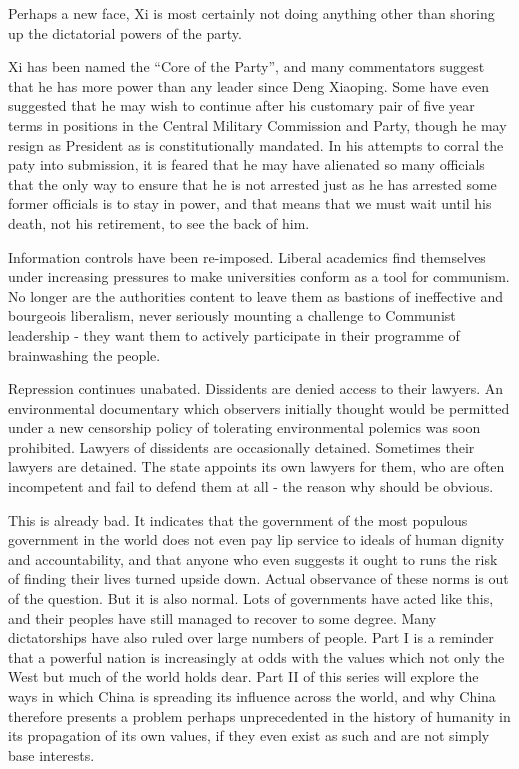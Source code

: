 \documentclass[1opt,a4paper]{article}
\newcounter{count}
\begin{document}
\begin{multicols}{2}
Perhaps a new face, Xi is most certainly not doing anything other than shoring up the dictatorial powers of the party.

Xi has been named the ``Core of the Party'', and many commentators suggest that he has more power than any leader since Deng Xiaoping. Some have even suggested that he may wish to continue after his customary pair of five year terms in positions in the Central Military Commission and Party, though he may resign as President as is constitutionally mandated. In his attempts to corral the paty into submission, it is feared that he may have alienated so many officials that the only way to ensure that he is not arrested just as he has arrested some former officials is to stay in power, and that means that we must wait until his death, not his retirement, to see the back of him.

Information controls have been re-imposed. Liberal academics find themselves under increasing pressures to make universities conform as a tool for communism. No longer are the authorities content to leave them as bastions of ineffective and bourgeois liberalism, never seriously mounting a challenge to Communist leadership - they want them to actively participate in their programme of brainwashing the people.

Repression continues unabated. Dissidents are denied access to their lawyers. An environmental documentary which observers initially thought would be permitted under a new censorship policy of tolerating environmental polemics was soon prohibited. Lawyers of dissidents are occasionally detained. Sometimes their lawyers are detained. The state appoints its own lawyers for them, who are often incompetent and fail to defend them at all - the reason why should be obvious.

This is already bad. It indicates that the government of the most populous government in the world does not even pay lip service to ideals of human dignity and accountability, and that anyone who even suggests it ought to runs the risk of finding their lives turned upside down. Actual observance of these norms is out of the question. But it is also normal. Lots of governments have acted like this, and their peoples have still managed to recover to some degree. Many dictatorships have also ruled over large numbers of people. Part I is a reminder that a powerful nation is increasingly at odds with the values which not only the West but much of the world holds dear. Part II of this series will explore the ways in which China is spreading its influence across the world, and why China therefore presents a problem perhaps unprecedented in the history of humanity in its propagation of its own values, if they even exist as such and are not simply base interests.



\end{multicols}


\end{document}
